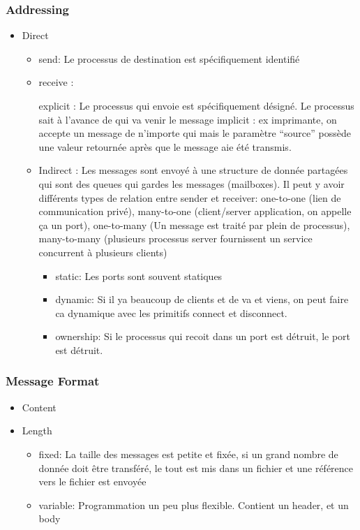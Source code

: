 \subsubsection{Addressing}
\begin{itemize}
  \item Direct
    \begin{itemize}
      \item send: Le processus de destination est spécifiquement identifié
      \item receive :

        explicit : Le processus qui envoie est spécifiquement désigné.
        Le processus sait à l'avance de qui va venir le message
        implicit : ex imprimante, on accepte un message de n'importe qui mais le paramètre ``source''
        possède une valeur retournée après que le message aie été transmis.
      \item Indirect : Les messages sont envoyé à une structure de donnée partagées qui sont des queues qui gardes les messages (mailboxes).
        Il peut y avoir différents types de relation entre sender et receiver:
        one-to-one (lien de communication privé),
        many-to-one (client/server application, on appelle ça un port),
        one-to-many (Un message est traité par plein de processus),
        many-to-many (plusieurs processus server fournissent un service concurrent à plusieurs clients)
        \begin{itemize}
          \item static: Les ports sont souvent statiques
          \item dynamic: Si il ya beaucoup de clients et de va et viens, on peut faire ca
            dynamique avec les primitifs connect et disconnect.
          \item ownership: Si le processus qui recoit dans un port est détruit, le port est détruit.
        \end{itemize}
    \end{itemize}
\end{itemize}

\subsubsection{Message Format}
\begin{itemize}
  \item Content
  \item Length
    \begin{itemize}
      \item fixed: La taille des messages est petite et fixée, si un grand nombre de donnée doit être transféré,
        le tout est mis dans un fichier et une référence vers le fichier est envoyée
      \item variable: Programmation un peu plus flexible.
        Contient un header, et un body
    \end{itemize}
\end{itemize}

